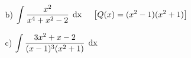 \documentclass[12pt]{article}
\begin{document}
\begin{enumerate}
\item[]
	\begin{enumerate}
	
 	\item[b)] $\displaystyle
 					\int
 					\frac
 						{x^2}{x^4+x^2-2}
 					\hspace*{1ex}																			\mathrm{dx} 
 					\hspace*{3ex} 															
 					\left[
 						Q(x)=(x^2-1)(x^2+1)
	 				\right]$\\
	 					
	\item[c)] $\displaystyle
					\int
					\frac
						{3x^2+x-2}{(x-1)^3(x^2+1)}															\hspace*{1ex}		
					\mathrm{dx}$\\
	\end{enumerate}

\end{enumerate}
\end{document}
